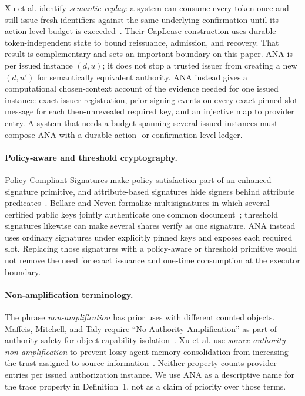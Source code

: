 \documentclass[10pt]{article}
\begin{document}
Xu et al. identify \emph{semantic replay}: a system can consume every token once
and still issue fresh identifiers against the same underlying confirmation until
its action-level budget is exceeded~\cite{caplease26}. Their CapLease construction
uses durable token-independent state to bound reissuance, admission, and recovery.
That result is complementary and sets an important boundary on this paper. ANA
is per issued instance $(d,u)$; it does not stop a trusted issuer from creating a new
$(d,u')$ for semantically equivalent authority. ANA instead gives a computational
chosen-context account of the evidence needed for one issued instance: exact
issuer registration, prior signing events on every exact pinned-slot message for
each then-unrevealed required key, and an injective
map to provider entry. A system that needs a budget spanning several issued
instances must compose ANA with a durable action- or confirmation-level ledger.

\paragraph{Policy-aware and threshold cryptography.}
Policy-Compliant Signatures make policy satisfaction part of an enhanced
signature primitive, and attribute-based signatures hide signers behind
attribute predicates~\cite{pcs21,abs08}. Bellare and Neven formalize
multisignatures in which several certified public keys jointly authenticate one
common document~\cite{bellareneven06}; threshold signatures likewise can make
several shares verify as one signature. ANA instead uses ordinary signatures under
explicitly pinned keys and exposes each required slot. Replacing those signatures
with a policy-aware or threshold primitive would not remove the need for exact
issuance and one-time consumption at the executor boundary.

\paragraph{Non-amplification terminology.}
The phrase \emph{non-amplification} has prior uses with different counted
objects. Maffeis, Mitchell, and Taly require ``No Authority Amplification'' as
part of authority safety for object-capability isolation~\cite{maffeis10}.
Xu et al. use \emph{source-authority non-amplification} to prevent lossy agent
memory consolidation from increasing the trust assigned to source
information~\cite{memoryna26}. Neither property counts provider entries per
issued authorization instance. We use ANA as a descriptive name for the trace
property in Definition~1, not as a claim of priority over those terms.
\end{document}
